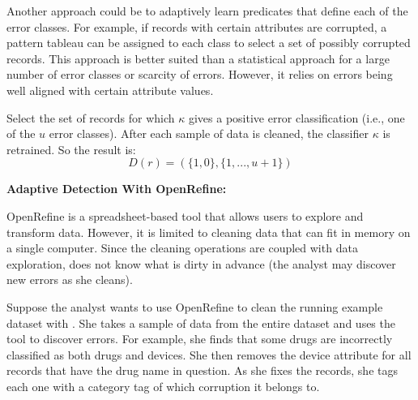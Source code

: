 Another approach could be to adaptively learn predicates that define each of the error classes.
For example, if records with certain attributes are corrupted, a pattern tableau can be assigned to each class to select a set of possibly corrupted records.
This approach is better suited than a statistical approach for a large number of error classes or scarcity of errors.
However, it relies on errors being well aligned with certain attribute values.

\begin{definition}
Select the set of records for which $\kappa$ gives a positive error classification (i.e., one of the $u$ error classes).
After each sample of data is cleaned, the classifier $\kappa$ is retrained.
So the result is:
\[D(r) = (\{1,0\},\{1,...,u+1\})\]
\end{definition}

\vspace{0.75em}

\noindent\textbf{Adaptive Detection With OpenRefine: }
\begin{example}\label{detex2}
OpenRefine is a spreadsheet-based tool that allows users to explore and transform data.
However, it is limited to cleaning data that can fit in memory on a single computer.
Since the cleaning operations are coupled with data exploration, \sys does not know what is dirty in advance (the analyst may discover new errors as she cleans).

Suppose the analyst wants to use OpenRefine to clean the running example dataset with \sys.
She takes a sample of data from the entire dataset and uses the tool to discover errors.
For example, she finds that some drugs are incorrectly classified as both drugs and devices.
She then removes the device attribute for all records that have the drug name in question.
As she fixes the records, she tags each one with a category tag of which corruption it belongs to.
\end{example}





